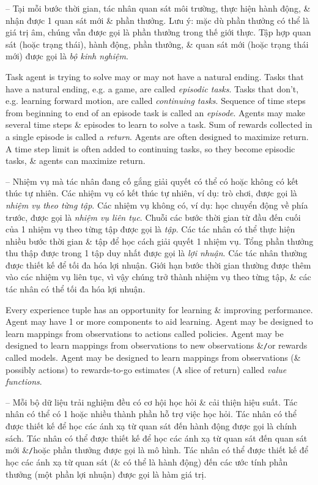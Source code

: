 \documentclass{article}
\begin{document}
\begin{itemize}
\begin{itemize}
\begin{itemize}
            -- Tại mỗi bước thời gian, tác nhân quan sát môi trường, thực hiện hành động, \& nhận được 1 quan sát mới \& phần thưởng. Lưu ý: mặc dù phần thưởng có thể là giá trị âm, chúng vẫn được gọi là phần thưởng trong thế giới thực. Tập hợp quan sát (hoặc trạng thái), hành động, phần thưởng, \& quan sát mới (hoặc trạng thái mới) được gọi là {\it bộ kinh nghiệm}.

            Task agent is trying to solve may or may not have a natural ending. Tasks that have a natural ending, e.g. a game, are called {\it episodic tasks}. Tasks that don't, e.g. learning forward motion, are called {\it continuing tasks}. Sequence of time steps from beginning to end of an episode task is called an {\it episode}. Agents may make several time steps \& episodes to learn to solve a task. Sum of rewards collected in a single episode is called a {\it return}. Agents are often designed to maximize return. A time step limit is often added to continuing tasks, so they become episodic tasks, \& agents can maximize return.

            -- Nhiệm vụ mà tác nhân đang cố gắng giải quyết có thể có hoặc không có kết thúc tự nhiên. Các nhiệm vụ có kết thúc tự nhiên, ví dụ: trò chơi, được gọi là {\it nhiệm vụ theo từng tập}. Các nhiệm vụ không có, ví dụ: học chuyển động về phía trước, được gọi là {\it nhiệm vụ liên tục}. Chuỗi các bước thời gian từ đầu đến cuối của 1 nhiệm vụ theo từng tập được gọi là {\it tập}. Các tác nhân có thể thực hiện nhiều bước thời gian \& tập để học cách giải quyết 1 nhiệm vụ. Tổng phần thưởng thu thập được trong 1 tập duy nhất được gọi là {\it lợi nhuận}. Các tác nhân thường được thiết kế để tối đa hóa lợi nhuận. Giới hạn bước thời gian thường được thêm vào các nhiệm vụ liên tục, vì vậy chúng trở thành nhiệm vụ theo từng tập, \& các tác nhân có thể tối đa hóa lợi nhuận.

            Every experience tuple has an opportunity for learning \& improving performance. Agent may have 1 or more components to aid learning. Agent may be designed to learn mappings from observations to actions called policies. Agent may be designed to learn mappings from observations to new observations \&{\tt/}or rewards called models. Agent may be designed to learn mappings from observations (\& possibly actions) to rewards-to-go estimates (A slice of return) called {\it value functions}.

            -- Mỗi bộ dữ liệu trải nghiệm đều có cơ hội học hỏi \& cải thiện hiệu suất. Tác nhân có thể có 1 hoặc nhiều thành phần hỗ trợ việc học hỏi. Tác nhân có thể được thiết kế để học các ánh xạ từ quan sát đến hành động được gọi là chính sách. Tác nhân có thể được thiết kế để học các ánh xạ từ quan sát đến quan sát mới \&{\tt/}hoặc phần thưởng được gọi là mô hình. Tác nhân có thể được thiết kế để học các ánh xạ từ quan sát (\& có thể là hành động) đến các ước tính phần thưởng (một phần lợi nhuận) được gọi là hàm giá trị.


\end{itemize}
\end{itemize}
\end{itemize}
\end{document}
